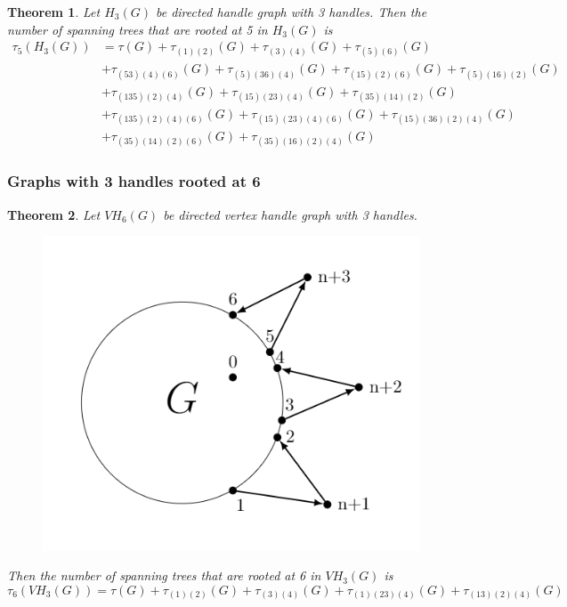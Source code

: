 \documentclass[twoside,11pt]{article}
\newtheorem{theorem}{Theorem}[section]
\numberwithin{equation}{section} \DeclareMathOperator{\Var}{Var}
\newcommand{\bthm}{\begin{theorem}}
\newcommand{\ethm}{\end{theorem}}
\begin{document}
\bthm
Let $H_3(G)$ be directed handle graph with 3 handles. Then the number of spanning trees that are rooted at 5 in $H_3(G)$ is
\begin{equation*}
    \begin{split}
        \tau_5(H_3(G)) &= \tau(G) + \tau_{(1)(2)}(G)+ \tau_{(3)(4)}(G) + \tau_{(5)(6)}(G)\\ 
        &+ \tau_{(53)(4)(6)}(G) + \tau_{(5)(36)(4)}(G) + \tau_{(15)(2)(6)}(G) + \tau_{(5)(16)(2)}(G)\\
        &+ \tau_{(135)(2)(4)}(G) + \tau_{(15)(23)(4)}(G) + \tau_{(35)(14)(2)}(G)\\
        &+ \tau_{(135)(2)(4)(6)}(G) + \tau_{(15)(23)(4)(6)}(G) + \tau_{(15)(36)(2)(4)}(G)\\
&+ \tau_{(35)(14)(2)(6)}(G) + \tau_{(35)(16)(2)(4)}(G)
    \end{split}
\end{equation*}
\ethm

\subsubsection{Graphs with 3 handles rooted at 6}
\bthm
Let $VH_6(G)$ be directed vertex handle graph with 3 handles. 
\begin{figure}[H]
    \centering
    \includegraphics[scale=0.4]{tik_3handles.PNG}
\end{figure}
Then the number of spanning trees that are rooted at 6 in $VH_3(G)$ is
\[
\tau_6(VH_3(G)) = \tau(G) + \tau_{(1)(2)}(G)+ \tau_{(3)(4)}(G) + \tau_{(1)(23)(4)}(G)+ \tau_{(13)(2)(4)}(G)
\]
\ethm
\end{document}
